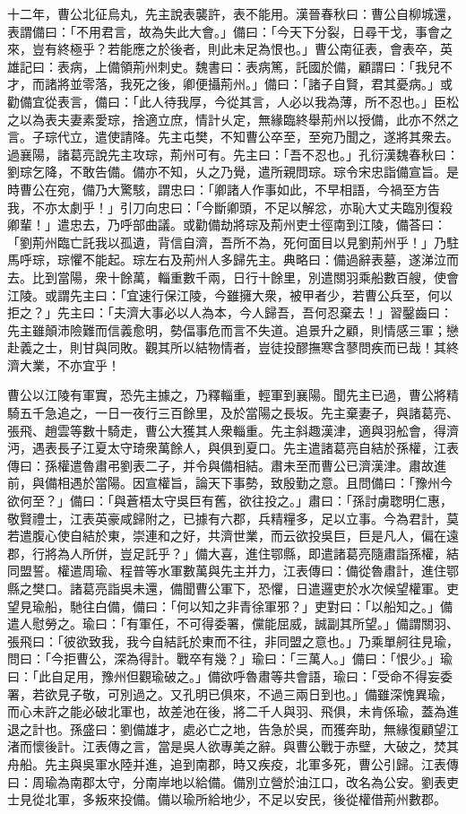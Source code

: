 \begin{pinyinscope}
十二年，曹公北征烏丸，先主說表襲許，表不能用。漢晉春秋曰：曹公自柳城還，表謂備曰：「不用君言，故為失此大會。」備曰：「今天下分裂，日尋干戈，事會之來，豈有終極乎？若能應之於後者，則此未足為恨也。」曹公南征表，會表卒，英雄記曰：表病，上備領荊州刺史。魏書曰：表病篤，託國於備，顧謂曰：「我兒不才，而諸將並零落，我死之後，卿便攝荊州。」備曰：「諸子自賢，君其憂病。」或勸備宜從表言，備曰：「此人待我厚，今從其言，人必以我為薄，所不忍也。」臣松之以為表夫妻素愛琮，捨適立庶，情計乆定，無緣臨終舉荊州以授備，此亦不然之言。子琮代立，遣使請降。先主屯樊，不知曹公卒至，至宛乃聞之，遂將其衆去。過襄陽，諸葛亮說先主攻琮，荊州可有。先主曰：「吾不忍也。」孔衍漢魏春秋曰：劉琮乞降，不敢告備。備亦不知，乆之乃覺，遣所親問琮。琮令宋忠詣備宣旨。是時曹公在宛，備乃大驚駭，謂忠曰：「卿諸人作事如此，不早相語，今禍至方告我，不亦太劇乎！」引刀向忠曰：「今斷卿頭，不足以解忿，亦恥大丈夫臨別復殺卿輩！」遣忠去，乃呼部曲議。或勸備劫將琮及荊州吏士徑南到江陵，備荅曰：「劉荊州臨亡託我以孤遺，背信自濟，吾所不為，死何面目以見劉荊州乎！」乃駐馬呼琮，琮懼不能起。琮左右及荊州人多歸先主。典略曰：備過辭表墓，遂涕泣而去。比到當陽，衆十餘萬，輜重數千兩，日行十餘里，別遣關羽乘船數百艘，使會江陵。或謂先主曰：「宜速行保江陵，今雖擁大衆，被甲者少，若曹公兵至，何以拒之？」先主曰：「夫濟大事必以人為本，今人歸吾，吾何忍棄去！」習鑿齒曰：先主雖顛沛險難而信義愈明，勢偪事危而言不失道。追景升之顧，則情感三軍；戀赴義之士，則甘與同敗。觀其所以結物情者，豈徒投醪撫寒含蓼問疾而已哉！其終濟大業，不亦宜乎！

曹公以江陵有軍實，恐先主據之，乃釋輜重，輕軍到襄陽。聞先主已過，曹公將精騎五千急追之，一日一夜行三百餘里，及於當陽之長坂。先主棄妻子，與諸葛亮、張飛、趙雲等數十騎走，曹公大獲其人衆輜重。先主斜趣漢津，適與羽舩會，得濟沔，遇表長子江夏太守琦衆萬餘人，與俱到夏口。先主遣諸葛亮自結於孫權，江表傳曰：孫權遣魯肅弔劉表二子，并令與備相結。肅未至而曹公已濟漢津。肅故進前，與備相遇於當陽。因宣權旨，論天下事勢，致殷勤之意。且問備曰：「豫州今欲何至？」備曰：「與蒼梧太守吳巨有舊，欲往投之。」肅曰：「孫討虜聦明仁惠，敬賢禮士，江表英豪咸歸附之，已據有六郡，兵精糧多，足以立事。今為君計，莫若遣腹心使自結於東，崇連和之好，共濟世業，而云欲投吳巨，巨是凡人，偏在遠郡，行將為人所併，豈足託乎？」備大喜，進住鄂縣，即遣諸葛亮隨肅詣孫權，結同盟誓。權遣周瑜、程普等水軍數萬與先主并力，江表傳曰：備從魯肅計，進住鄂縣之樊口。諸葛亮詣吳未還，備聞曹公軍下，恐懼，日遣邏吏於水次候望權軍。吏望見瑜船，馳往白備，備曰：「何以知之非青徐軍邪？」吏對曰：「以船知之。」備遣人慰勞之。瑜曰：「有軍任，不可得委署，儻能屈威，誠副其所望。」備謂關羽、張飛曰：「彼欲致我，我今自結託於東而不往，非同盟之意也。」乃乘單舸往見瑜，問曰：「今拒曹公，深為得計。戰卒有幾？」瑜曰：「三萬人。」備曰：「恨少。」瑜曰：「此自足用，豫州但觀瑜破之。」備欲呼魯肅等共會語，瑜曰：「受命不得妄委署，若欲見子敬，可別過之。又孔明已俱來，不過三兩日到也。」備雖深愧異瑜，而心未許之能必破北軍也，故差池在後，將二千人與羽、飛俱，未肯係瑜，蓋為進退之計也。孫盛曰：劉備雄才，處必亡之地，告急於吳，而獲奔助，無緣復顧望江渚而懷後計。江表傳之言，當是吳人欲專美之辭。與曹公戰于赤壁，大破之，焚其舟船。先主與吳軍水陸并進，追到南郡，時又疾疫，北軍多死，曹公引歸。江表傳曰：周瑜為南郡太守，分南岸地以給備。備別立營於油江口，改名為公安。劉表吏士見從北軍，多叛來投備。備以瑜所給地少，不足以安民，後從權借荊州數郡。


\end{pinyinscope}
